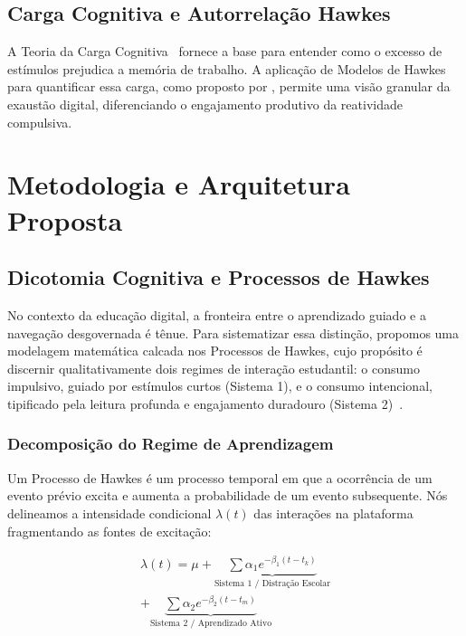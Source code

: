 \documentclass[english, spanish, brazilian]{RBIEarticle}
\begin{document}
\subsection{Carga Cognitiva e Autorrelação Hawkes}
A Teoria da Carga Cognitiva~\citep{paas2023} fornece a base para entender como o excesso de estímulos prejudica a memória de trabalho. A aplicação de Modelos de Hawkes para quantificar essa carga, como proposto por \textcite{agarwal2024}, permite uma visão granular da exaustão digital, diferenciando o engajamento produtivo da reatividade compulsiva.

\section{Metodologia e Arquitetura Proposta}

\subsection{Dicotomia Cognitiva e Processos de Hawkes}

No contexto da educação digital, a fronteira entre o aprendizado guiado e a navegação desgovernada é tênue. Para sistematizar essa distinção, propomos uma modelagem matemática calcada nos Processos de Hawkes, cujo propósito é discernir qualitativamente dois regimes de interação estudantil: o consumo impulsivo, guiado por estímulos curtos (Sistema 1), e o consumo intencional, tipificado pela leitura profunda e engajamento duradouro (Sistema 2)~\citep{kahneman2011}.

\subsubsection{Decomposição do Regime de Aprendizagem}

Um Processo de Hawkes é um processo temporal em que a ocorrência de um evento prévio excita e aumenta a probabilidade de um evento subsequente. Nós delineamos a intensidade condicional $\lambda(t)$ das interações na plataforma fragmentando as fontes de excitação:

\begin{multline} \label{eq:hawkes}
    \lambda(t) = \mu + \underbrace{\sum \alpha_1 e^{-\beta_1(t-t_k)}}_{\text{Sistema 1 / Distração Escolar}} \\
    + \underbrace{\sum \alpha_2 e^{-\beta_2(t-t_m)}}_{\text{Sistema 2 / Aprendizado Ativo}}
\end{multline}
\end{document}
